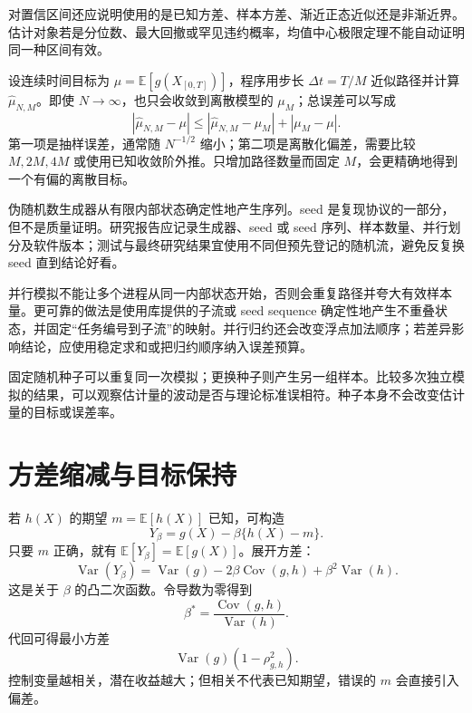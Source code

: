 对置信区间还应说明使用的是已知方差、样本方差、渐近正态近似还是非渐近界。估计对象若是分位数、最大回撤或罕见违约概率，均值中心极限定理不能自动证明同一种区间有效。

\begin{example}[路径离散化也会产生偏差]
设连续时间目标为 $\mu=\mathbb E[g(X_{[0,T]})]$，程序用步长 $\Delta t=T/M$ 近似路径并计算 $\hat\mu_{N,M}$。即使 $N\to\infty$，也只会收敛到离散模型的 $\mu_M$；总误差可以写成
\[
 |\hat\mu_{N,M}-\mu|
 \le |\hat\mu_{N,M}-\mu_M|
   +|\mu_M-\mu|.
\]
第一项是抽样误差，通常随 $N^{-1/2}$ 缩小；第二项是离散化偏差，需要比较 $M,2M,4M$ 或使用已知收敛阶外推。只增加路径数量而固定 $M$，会更精确地得到一个有偏的离散目标。
\end{example}


伪随机数生成器从有限内部状态确定性地产生序列。seed 是复现协议的一部分，但不是质量证明。研究报告应记录生成器、seed 或 seed 序列、样本数量、并行划分及软件版本；测试与最终研究结果宜使用不同但预先登记的随机流，避免反复换 seed 直到结论好看。

并行模拟不能让多个进程从同一内部状态开始，否则会重复路径并夸大有效样本量。更可靠的做法是使用库提供的子流或 seed sequence 确定性地产生不重叠状态，并固定“任务编号到子流”的映射。并行归约还会改变浮点加法顺序；若差异影响结论，应使用稳定求和或把归约顺序纳入误差预算。

\begin{note}
固定随机种子可以重复同一次模拟；更换种子则产生另一组样本。比较多次独立模拟的结果，可以观察估计量的波动是否与理论标准误相符。种子本身不会改变估计量的目标或误差率。
\end{note}

\section{方差缩减与目标保持}

若 $h(X)$ 的期望 $m=\mathbb E[h(X)]$ 已知，可构造
\[
  Y_\beta=g(X)-\beta\{h(X)-m\}.
\]
只要 $m$ 正确，就有 $\mathbb E[Y_\beta]=\mathbb E[g(X)]$。展开方差：
\[
  \operatorname{Var}(Y_\beta)
  =\operatorname{Var}(g)-2\beta\operatorname{Cov}(g,h)
   +\beta^2\operatorname{Var}(h).
\]
这是关于 $\beta$ 的凸二次函数。令导数为零得到
\[
  \beta^*=\frac{\operatorname{Cov}(g,h)}{\operatorname{Var}(h)}.
\]
代回可得最小方差
\[
  \operatorname{Var}(g)(1-\rho_{g,h}^2).
\]
控制变量越相关，潜在收益越大；但相关不代表已知期望，错误的 $m$ 会直接引入偏差。


